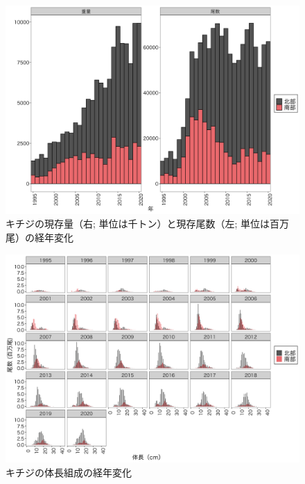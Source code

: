 \documentclass[11pt]{article} %
\begin{document}
\begin{linenumbers}
\begin{figure}[h]
  \centering
  \includegraphics[width = 14cm]{キチジtrend.png}
  \caption{キチジの現存量（右; 単位は千トン）と現存尾数（左; 単位は百万尾）の経年変化}
\end{figure}

\begin{figure}[h]
  \centering
  \includegraphics[width = 14cm]{キチジlength.png}
  \caption{キチジの体長組成の経年変化}
\end{figure}


\end{linenumbers}
\end{document}
